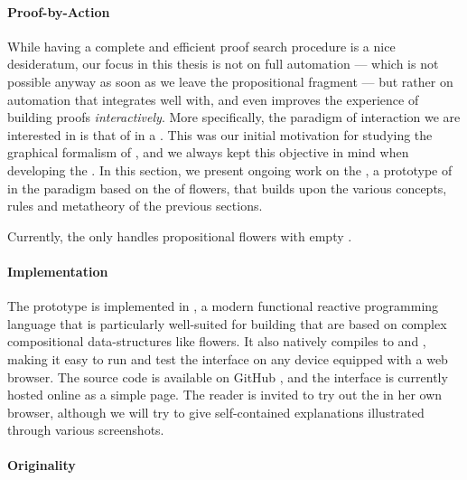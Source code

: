 \begin{scope}
\paragraph{Proof-by-Action}

While having a complete and efficient proof search procedure is a nice
desideratum, our focus in this thesis is not on full automation --- which is not
possible anyway as soon as we leave the propositional fragment --- but rather on
automation that integrates well with, and even improves the experience of
building proofs \emph{interactively}. More specifically, the paradigm of
interaction we are interested in is that of \emph{} in a
. This was our initial motivation for studying the graphical formalism
of , and we always kept this objective in mind when developing the
. In this section, we present ongoing work on the
, a prototype of  in the 
paradigm based on the  of flowers, that builds upon the
various concepts, rules and metatheory of the previous sections.

\begin{kaonote}
Currently, the  only handles propositional flowers with empty
.
\end{kaonote}

\paragraph{Implementation}

\AP
The prototype is implemented in  ,
a modern functional reactive programming language that is particularly
well-suited for building  that are based on complex compositional
data-structures like flowers. It also natively compiles to  and ,
making it easy to run and test the interface on any device equipped with a web
browser. The source code is available on GitHub \cite{flower-prover}, and the
interface is currently hosted online as a simple 
page.
The reader is invited to try out the  in her own browser, although
we will try to give self-contained explanations illustrated through various
screenshots.

\paragraph{Originality}


\end{scope}
